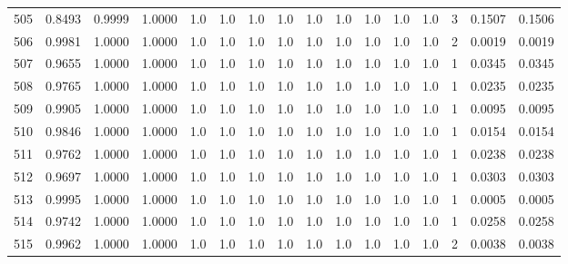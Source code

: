 \begin{tabular}{lrrrrrrrrrrrrrrr}
505 &      0.8493 &  0.9999 &  1.0000 &     1.0 &     1.0 &     1.0 &     1.0 &     1.0 &     1.0 &     1.0 &      1.0 &        1.0 &      3 &                    0.1507 &                     0.1506 \\
506 &      0.9981 &  1.0000 &  1.0000 &     1.0 &     1.0 &     1.0 &     1.0 &     1.0 &     1.0 &     1.0 &      1.0 &        1.0 &      2 &                    0.0019 &                     0.0019 \\
507 &      0.9655 &  1.0000 &  1.0000 &     1.0 &     1.0 &     1.0 &     1.0 &     1.0 &     1.0 &     1.0 &      1.0 &        1.0 &      1 &                    0.0345 &                     0.0345 \\
508 &      0.9765 &  1.0000 &  1.0000 &     1.0 &     1.0 &     1.0 &     1.0 &     1.0 &     1.0 &     1.0 &      1.0 &        1.0 &      1 &                    0.0235 &                     0.0235 \\
509 &      0.9905 &  1.0000 &  1.0000 &     1.0 &     1.0 &     1.0 &     1.0 &     1.0 &     1.0 &     1.0 &      1.0 &        1.0 &      1 &                    0.0095 &                     0.0095 \\
510 &      0.9846 &  1.0000 &  1.0000 &     1.0 &     1.0 &     1.0 &     1.0 &     1.0 &     1.0 &     1.0 &      1.0 &        1.0 &      1 &                    0.0154 &                     0.0154 \\
511 &      0.9762 &  1.0000 &  1.0000 &     1.0 &     1.0 &     1.0 &     1.0 &     1.0 &     1.0 &     1.0 &      1.0 &        1.0 &      1 &                    0.0238 &                     0.0238 \\
512 &      0.9697 &  1.0000 &  1.0000 &     1.0 &     1.0 &     1.0 &     1.0 &     1.0 &     1.0 &     1.0 &      1.0 &        1.0 &      1 &                    0.0303 &                     0.0303 \\
513 &      0.9995 &  1.0000 &  1.0000 &     1.0 &     1.0 &     1.0 &     1.0 &     1.0 &     1.0 &     1.0 &      1.0 &        1.0 &      1 &                    0.0005 &                     0.0005 \\
514 &      0.9742 &  1.0000 &  1.0000 &     1.0 &     1.0 &     1.0 &     1.0 &     1.0 &     1.0 &     1.0 &      1.0 &        1.0 &      1 &                    0.0258 &                     0.0258 \\
515 &      0.9962 &  1.0000 &  1.0000 &     1.0 &     1.0 &     1.0 &     1.0 &     1.0 &     1.0 &     1.0 &      1.0 &        1.0 &      2 &                    0.0038 &                     0.0038 \\

\end{tabular}
